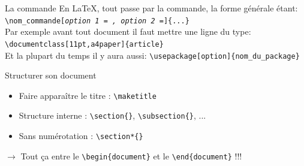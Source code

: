 \documentclass[handout]{beamer}
\begin{document}
\begin{frame}[fragile]{La commande}
En \LaTeX, tout passe par la commande, la forme générale étant:\\
\texttt{\textbackslash nom\_commande[\textit{option 1 = , option 2 =}]\{...\}}\\[0.5cm]

Par exemple avant tout document il faut mettre une ligne du type:\\
\texttt{\textbackslash documentclass[11pt,a4paper]\{article\}}\\[0.5cm]

Et la plupart du temps il y aura aussi:
\texttt{\textbackslash usepackage[option]\{nom\_du\_package\}}
\end{frame}

\begin{frame}{Structurer son document}
\begin{itemize}
	\item Faire apparaître le titre : \texttt{\textbackslash maketitle}
	\item Structure interne : \texttt{\textbackslash section\{\}}, \texttt{\textbackslash subsection\{\}}, ...
	\item Sans numérotation : \texttt{\textbackslash section*\{\}}
	
\end{itemize}
\vfill
$\longrightarrow$ Tout ça entre le \texttt{\textbackslash begin\{document\}} et le \texttt{\textbackslash end\{document\}} !!!
\end{frame}
\end{document}
